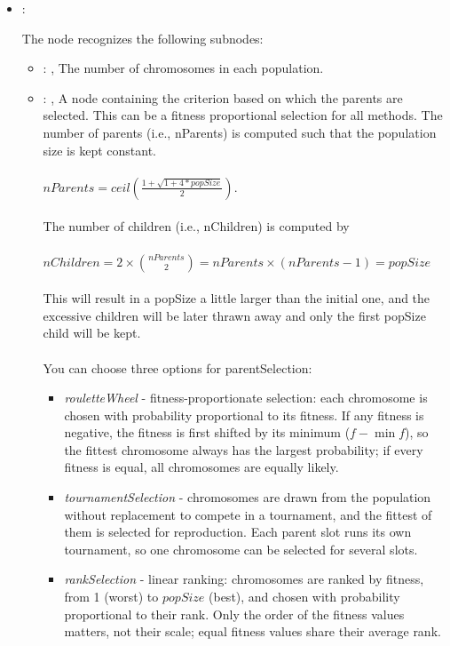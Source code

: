 \begin{itemize}
    \item {}:


      The  node recognizes the following subnodes:
      \begin{itemize}
        \item {}: ,
          The number of chromosomes in each population.

        \item {}: ,
          A node containing the criterion based on which the parents are selected. This can be a
          fitness proportional selection for all methods.                   The number of parents
          (i.e., nParents) is computed such that the population size is kept constant. \\\\
          $nParents = ceil(\frac{1 + \sqrt{1+4*popSize}}{2})$. \\\\                   The number of
          children (i.e., nChildren) is computed by \\\\                   $nChildren = 2 \times
          {nParents \choose 2} = nParents \times (nParents-1) = popSize$ \\\\                   This
          will result in a popSize a little larger than the initial one, and the excessive children
          will be later thrawn away and only the first popSize child will be kept. \\\\
          You can choose three options for parentSelection:                       \begin{itemize}
          \item \textit{rouletteWheel} - fitness-proportionate selection: each chromosome is chosen
          with                           probability proportional to its fitness. If any fitness is
          negative, the fitness is first shifted                           by its minimum ($f - \min
          f$), so the fittest chromosome always has the largest probability; if
          every fitness is equal, all chromosomes are equally likely.
          \item \textit{tournamentSelection} -  chromosomes are drawn from the
          population                           without replacement to compete in a tournament, and
          the fittest of them is selected for reproduction.                           Each parent
          slot runs its own tournament, so one chromosome can be selected for several slots.
          \item \textit{rankSelection} - linear ranking: chromosomes are ranked by fitness, from 1
          (worst) to                           $popSize$ (best), and chosen with probability
          proportional to their rank. Only the order of the                           fitness values
          matters, not their scale; equal fitness values share their average rank.
          \end{itemize}


\end{itemize}
\end{itemize}
